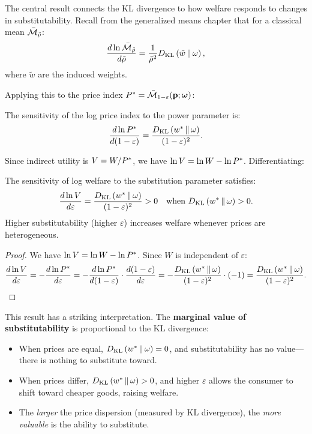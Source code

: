 The central result connects the KL divergence to how welfare responds to changes in substitutability. Recall from the generalized means chapter that for a classical mean $\bar{\mathcal{M}}_{\tilde{\rho}}$:
\begin{equation}
\frac{d \ln \bar{\mathcal{M}}_{\tilde{\rho}}}{d\tilde{\rho}} = \frac{1}{\tilde{\rho}^2} D_{\mathrm{KL}}\left(\tilde{w} \,\|\, \omega\right),
\end{equation}
where $\tilde{w}$ are the induced weights.

Applying this to the price index $P^{*} = \bar{\mathcal{M}}_{1-\varepsilon}(\mathbf{p}; \boldsymbol{\omega})$:

\begin{proposition}
\label{prop:price-sensitivity}
The sensitivity of the log price index to the power parameter is:
\begin{equation}
\frac{d \ln P^{*}}{d(1-\varepsilon)} = \frac{D_{\mathrm{KL}}\left(w^* \,\|\, \omega\right)}{(1-\varepsilon)^2}.
\end{equation}
\end{proposition}

Since indirect utility is $V = W/P^{*}$, we have $\ln V = \ln W - \ln P^{*}$. Differentiating:

\begin{proposition}
\label{prop:welfare-sensitivity}
The sensitivity of log welfare to the substitution parameter satisfies:
\begin{equation}
\frac{d \ln V}{d\varepsilon} = \frac{D_{\mathrm{KL}}\left(w^* \,\|\, \omega\right)}{(1-\varepsilon)^2} > 0 \quad \text{when } D_{\mathrm{KL}}\left(w^* \,\|\, \omega\right) > 0.
\end{equation}
Higher substitutability (higher $\varepsilon$) increases welfare whenever prices are heterogeneous.
\end{proposition}

\begin{proof}
We have $\ln V = \ln W - \ln P^{*}$. Since $W$ is independent of $\varepsilon$:
\[
\frac{d \ln V}{d\varepsilon} = -\frac{d \ln P^{*}}{d\varepsilon} = -\frac{d \ln P^{*}}{d(1-\varepsilon)} \cdot \frac{d(1-\varepsilon)}{d\varepsilon} = -\frac{D_{\mathrm{KL}}\left(w^* \,\|\, \omega\right)}{(1-\varepsilon)^2} \cdot (-1) = \frac{D_{\mathrm{KL}}\left(w^* \,\|\, \omega\right)}{(1-\varepsilon)^2}.
\]
\end{proof}

\begin{calloutimportant}
This result has a striking interpretation. The \textbf{marginal value of substitutability} is proportional to the KL divergence:
\begin{itemize}[nosep, leftmargin=1.5em]
    \item When prices are equal, $D_{\mathrm{KL}}\left(w^* \,\|\, \omega\right) = 0$, and substitutability has no value---there is nothing to substitute toward.
    \item When prices differ, $D_{\mathrm{KL}}\left(w^* \,\|\, \omega\right) > 0$, and higher $\varepsilon$ allows the consumer to shift toward cheaper goods, raising welfare.
    \item The \emph{larger} the price dispersion (measured by KL divergence), the \emph{more valuable} is the ability to substitute.
\end{itemize}
\end{calloutimportant}

